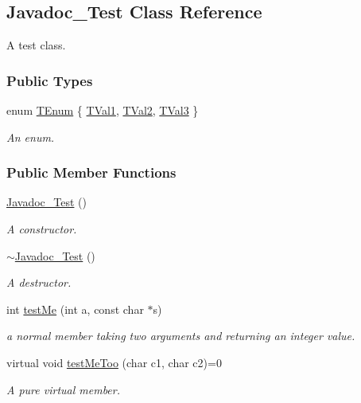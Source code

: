 \hypertarget{class_javadoc___test}{}\subsection{Javadoc\+\_\+\+Test Class Reference}
\label{class_javadoc___test}


A test class.  


\subsubsection*{Public Types}
\begin{DoxyCompactItemize}
\item 
enum \mbox{\hyperlink{class_javadoc___test_ae37fd1cbf1af522674cbd33873b786a6}{T\+Enum}} \{ \mbox{\hyperlink{class_javadoc___test_ae37fd1cbf1af522674cbd33873b786a6a90f0d8d4f07a79342261fb1c191af72b}{T\+Val1}}, 
\mbox{\hyperlink{class_javadoc___test_ae37fd1cbf1af522674cbd33873b786a6a5954e696a652f442d7255af4e0d35d61}{T\+Val2}}, 
\mbox{\hyperlink{class_javadoc___test_ae37fd1cbf1af522674cbd33873b786a6ab4a4dc16e1050c9604cf5c46a51e5a8e}{T\+Val3}}
 \}
\begin{DoxyCompactList}\small\item\em An enum. \end{DoxyCompactList}\end{DoxyCompactItemize}
\subsubsection*{Public Member Functions}
\begin{DoxyCompactItemize}
\item 
\mbox{\hyperlink{class_javadoc___test_a17313327932ae97596b0a455ba8342cc}{Javadoc\+\_\+\+Test}} ()
\begin{DoxyCompactList}\small\item\em A constructor. \end{DoxyCompactList}\item 
\mbox{\hyperlink{class_javadoc___test_a60016cd15a4ed82bbc35be79a0a6a6b5}{$\sim$\+Javadoc\+\_\+\+Test}} ()
\begin{DoxyCompactList}\small\item\em A destructor. \end{DoxyCompactList}\item 
int \mbox{\hyperlink{class_javadoc___test_a0c472683ed25ff096e8a9edfb18d550c}{test\+Me}} (int a, const char $\ast$s)
\begin{DoxyCompactList}\small\item\em a normal member taking two arguments and returning an integer value. \end{DoxyCompactList}\item 
virtual void \mbox{\hyperlink{class_javadoc___test_ac2b39cabbe80957ae3e8bc2bd4e887f6}{test\+Me\+Too}} (char c1, char c2)=0
\begin{DoxyCompactList}\small\item\em A pure virtual member. \end{DoxyCompactList}\end{DoxyCompactItemize}
